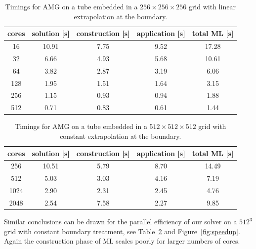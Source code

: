 \begin{table}[htb]
  \begin{center}
    \begin{tabular}{ccccc}
      \hline
      cores & solution [s] & construction [s] & application [s] & total ML [s] \\
      \hline
      16  & 10.91 &  7.75 &  9.52 & 17.28 \\
      32  &  6.66 &  4.93 &  5.68 & 10.61 \\
      64  &  3.82 &  2.87 &  3.19 &  6.06 \\
      128 &  1.95 &  1.51 &  1.64 &  3.15 \\
      256 &  1.15 &  0.93 &  0.94 &  1.88 \\
      512 &  0.71 &  0.83 &  0.61 &  1.44 \\
      \hline
    \end{tabular}
    \caption{Timings for AMG on a tube embedded in a $256\times256\times256$
      grid with linear extrapolation at the boundary.}
    \label{tbl:timings_solver_256}
    \end{center}
\end{table}


\begin{table}[htb]
  \begin{center}
    \begin{tabular}{ccccc}
      \hline
      cores & solution [s] & construction [s] & application [s] & total ML [s] \\
      \hline
      256  &  10.51 &  5.79 &  8.70 &  14.49 \\
      512  &  5.03 &  3.03 &  4.16 &  7.19 \\
      1024 &  2.90 &  2.31 &  2.45 &  4.76 \\
      2048 &  2.54 &  7.58 &  2.27 &  9.85 \\
      \hline
    \end{tabular}
    \caption{Timings for AMG on a tube embedded in a $512\times512\times512$
      grid with constant extrapolation at the boundary.}
    \label{tbl:timings_solver_512} 
  \end{center}
\end{table}

Similar conclusions can be drawn for the parallel efficiency of our
solver on a $512^3$ grid with constant boundary treatment, see
Table~\ref{tbl:timings_solver_512} and Figure~\ref{fig:speedup}.  Again the
construction phase of ML scales poorly for larger numbers of cores.

